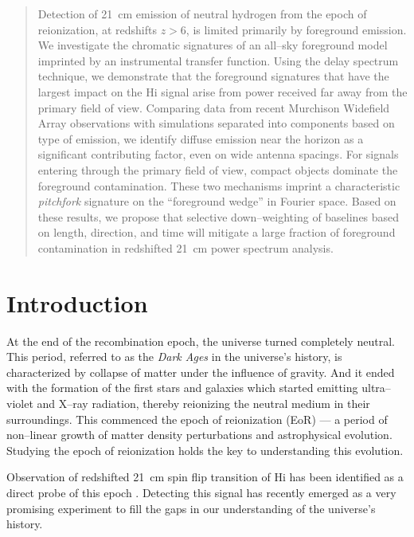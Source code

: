 \documentclass[preprint2,iop,numberedappendix]{emulateapj}
\begin{document}
\begin{abstract}

Detection of 21~cm emission of neutral hydrogen from the epoch of reionization, at redshifts $z>6$, is limited primarily by foreground emission.  We investigate the chromatic signatures of an all--sky foreground model imprinted by an instrumental transfer function.  Using the delay spectrum technique, we demonstrate that the foreground signatures that have the largest impact on the H{\sc i} signal arise from power received far away from the primary field of view. Comparing data from recent Murchison Widefield Array observations with simulations separated into components based on type of emission, we identify diffuse emission near the horizon as a significant contributing factor, even on wide antenna spacings. For signals entering through the primary field of view, compact objects dominate the foreground contamination. These two mechanisms imprint a characteristic {\it pitchfork} signature on the ``foreground wedge'' in Fourier space.  Based on these results, we propose that selective down--weighting of baselines based on length, direction, and time will mitigate a large fraction of foreground contamination in redshifted 21~cm power spectrum analysis.

\end{abstract}
 

\section{Introduction}\label{intro}

At the end of the recombination epoch, the universe turned completely neutral. This period, referred to as the {\it Dark Ages} in the universe's history, is characterized by collapse of matter under the influence of gravity. And it ended with the formation of the first stars and galaxies which started emitting ultra--violet and X--ray radiation, thereby reionizing the neutral medium in their surroundings. This commenced the epoch of reionization (EoR) --- a period of non--linear growth of matter density perturbations and astrophysical evolution. Studying the epoch of reionization holds the key to understanding this evolution. 

Observation of redshifted 21~cm spin flip transition of H{\sc i} has been identified as a direct probe of this epoch \citep{sun72,sco90,mad97,toz00,ili02}. Detecting this signal has recently emerged as a very promising experiment to fill the gaps in our understanding of the universe's history.  
\end{document}
